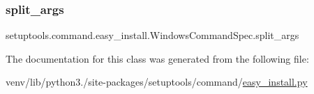 \subsubsection{\texorpdfstring{split\+\_\+args}{split\_args}}
{\footnotesize\ttfamily setuptools.\+command.\+easy\+\_\+install.\+Windows\+Command\+Spec.\+split\+\_\+args\hspace{0.3cm}{\ttfamily [static]}}



The documentation for this class was generated from the following file\+:\begin{DoxyCompactItemize}
\item 
venv/lib/python3./site-\/packages/setuptools/command/\hyperlink{easy__install_8py}{easy\+\_\+install.\+py}\end{DoxyCompactItemize}
